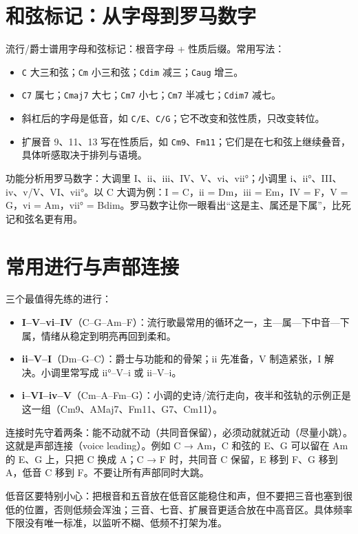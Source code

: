 \section{和弦标记：从字母到罗马数字}

流行/爵士谱用字母和弦标记：根音字母 + 性质后缀。常用写法：

\begin{itemize}
  \item \texttt{C} 大三和弦；\texttt{Cm} 小三和弦；\texttt{Cdim} 减三；\texttt{Caug} 增三。
  \item \texttt{C7} 属七；\texttt{Cmaj7} 大七；\texttt{Cm7} 小七；\texttt{Cm7} 半减七；\texttt{Cdim7} 减七。
  \item 斜杠后的字母是低音，如 \texttt{C/E}、\texttt{C/G}；它不改变和弦性质，只改变转位。
  \item 扩展音 9、11、13 写在性质后，如 \texttt{Cm9}、\texttt{Fm11}；它们是在七和弦上继续叠音，具体听感取决于排列与语境。
\end{itemize}

功能分析用罗马数字：大调里 I、ii、iii、IV、V、vi、vii°；小调里 i、ii°、III、iv、v/V、VI、vii°。以 C 大调为例：I = C，ii = Dm，iii = Em，IV = F，V = G，vi = Am，vii° = Bdim。罗马数字让你一眼看出“这是主、属还是下属”，比死记和弦名更有用。

\section{常用进行与声部连接}

三个最值得先练的进行：

\begin{itemize}
  \item \textbf{I–V–vi–IV}（C–G–Am–F）：流行歌最常用的循环之一，主—属—下中音—下属，情绪从稳定到明亮再回到柔和。
  \item \textbf{ii–V–I}（Dm–G–C）：爵士与功能和的骨架；ii 先准备，V 制造紧张，I 解决。小调里常写成 ii°–V–i 或 ii–V–i。
  \item \textbf{i–VI–iv–V}（Cm–A\flatsym–Fm–G）：小调的史诗/流行走向，夜半和弦轨的示例正是这一组（Cm9、A\flatsym Maj7、Fm11、G7、Cm11）。
\end{itemize}

连接时先守着两条：能不动就不动（共同音保留），必须动就就近动（尽量小跳）。这就是声部连接（voice leading）。例如 C → Am，C 和弦的 E、G 可以留在 Am 的 E、G 上，只把 C 换成 A；C → F 时，共同音 C 保留，E 移到 F、G 移到 A，低音 C 移到 F。不要让所有声部同时大跳。

低音区要特别小心：把根音和五音放在低音区能稳住和声，但不要把三音也塞到很低的位置，否则低频会浑浊；三音、七音、扩展音更适合放在中高音区。具体频率下限没有唯一标准，以监听不糊、低频不打架为准。

